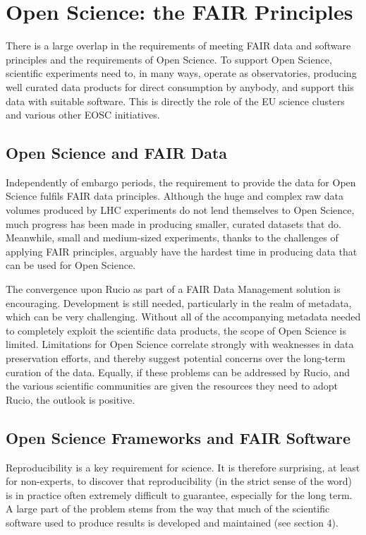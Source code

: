 \section{Open Science: the FAIR Principles}

There is a large overlap in the requirements of meeting FAIR data and software principles
and the requirements of Open Science. To support Open Science, scientific experiments need to, in many ways, operate as observatories, producing well curated data products for direct consumption by anybody, and support this data with suitable software. This is directly the role of the EU science clusters and various other EOSC initiatives.


\subsection{Open Science and FAIR Data}

Independently of embargo periods, the requirement to provide the data for Open Science fulfils FAIR data principles.  Although the huge and complex raw data volumes produced by LHC experiments do not lend themselves to Open Science, much progress has been made in producing smaller, curated datasets that do.  Meanwhile, small and medium-sized experiments, thanks to the challenges of applying FAIR principles, arguably have the hardest time in producing data that can be used for Open Science.

The convergence upon Rucio as part of a FAIR Data Management solution is encouraging.  Development is still needed, particularly in the realm of metadata, which can be very challenging.  Without all of the accompanying metadata needed to completely exploit the scientific data products, the scope of Open Science is limited.  Limitations for Open Science correlate strongly with weaknesses in data preservation efforts, and thereby suggest potential concerns over the long-term curation of the data.  Equally, if these problems can be addressed by Rucio, and the various scientific communities are given the resources they need to adopt Rucio, the outlook is positive.

\subsection{Open Science Frameworks and FAIR Software}

Reproducibility is a key requirement for science.  It is therefore surprising, at least for non-experts, to discover that reproducibility (in the strict sense of the word) is in practice often extremely difficult to guarantee, especially for the long term. A large part of the problem stems from the way that much of the scientific software used to produce results is developed and maintained (see section 4).

